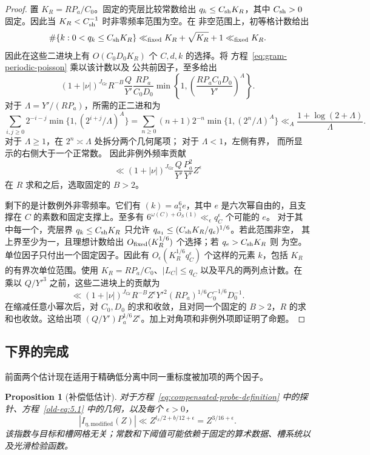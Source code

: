 \documentclass[11pt,a4paper]{article}
\numberwithin{equation}{section}
\numberwithin{figure}{section}
\newtheorem{proposition}[theorem]{Proposition}
\theoremstyle{definition}
\theoremstyle{remark}
\begin{document}
\begin{proof}
置 $K_R=RP_a/C_0$。固定的壳层比较常数给出
$q_k\le C_{\rm sh}K_R$，其中 $C_{\rm sh}>0$ 固定。因此当
$K_R<C_{\rm sh}^{-1}$ 时非零频率范围为空。在
非空范围上，初等格计数给出
\[
 \#\{k:0<q_k\le C_{\rm sh}K_R\}
       \ll_{\rm fixed}K_R+\sqrt{K_R}+1\ll_{\rm fixed}K_R.
\]
因此在这些二进块上有 $O(C_0D_0K_R)$ 个 $C,d,k$ 的选择。将
方程~\eqref{eq:gram-periodic-poisson} 乘以该计数以及
公共前因子，至多给出
\[
 (1+|\nu|)^{J_{\mathrm{Gr}}} R^{-B}\frac Q{Y'}\frac{RP_a}{C_0D_0}
       \min\left\{1,\left(\frac{RP_aC_0D_0}{Y'}\right)^A\right\}.
\]
对于 $\Lambda=Y'/(RP_a)$，所需的正二进和为
\[
 \sum_{i,j\ge0}2^{-i-j}\min\{1,(2^{i+j}/\Lambda)^A\}
 =\sum_{n\ge0}(n+1)2^{-n}\min\{1,(2^n/\Lambda)^A\}
 \ll_A\frac{1+\log(2+\Lambda)}{\Lambda}.
\]
对于 $\Lambda\ge1$，在 $2^n\asymp\Lambda$ 处拆分两个几何尾项；
对于 $\Lambda<1$，左侧有界，
而所显示的右侧大于一个正常数。
因此非例外频率贡献
\[
 \ll (1+|\nu|)^{J_{\mathrm{Gr}}}\frac Q{Y'}\frac{P_a^2}{Y'}Z^\epsilon
\]
在 $R$ 求和之后，选取固定的 $B>2$。

剩下的是计数例外非零频率。它们有
$(k)=a_1^6e$，其中 $e$ 是六次幂自由的，且支撑在
$C$ 的素数和固定支撑上。至多有
$6^{\omega(C)+O_S(1)}\ll_\epsilon q_C^\epsilon$ 个可能的 $e$。
对于其中每一个，壳层界 $q_k\le C_{\rm sh}K_R$ 只允许
$q_{a_1}\le(C_{\rm sh}K_R/q_e)^{1/6}$。若此范围非空，
其上界至少为一，且理想计数给出
$O_{\rm fixed}(K_R^{1/6})$ 个选择；若 $q_e>C_{\rm sh}K_R$ 则
为空。单位因子只付出一个固定因子。因此有
$O_\epsilon(K_R^{1/6}q_C^\epsilon)$ 个这样的元素 $k$，包括
$K_R$ 的有界次单位范围。使用 $K_R=RP_a/C_0$、$|L_C|\le q_C$ 以及平凡的两列点计数。在乘以 $Q/Y'^3$ 之前，这些二进块上的贡献为
\[
 \ll (1+|\nu|)^{J_{\mathrm{Gr}}} R^{-B}Z^\epsilon
       Y'^2(RP_a)^{1/6}C_0^{-1/6}D_0^{-1}.
\]
在缩减任意小幂次后，对 $C_0,D_0$ 的求和收敛，且对同一个固定的 $B>2$，$R$ 的求和也收敛。这给出项 $(Q/Y')P_a^{1/6}Z^\epsilon$。加上对角项和非例外项即证明了命题。
\end{proof}

\subsection{下界的完成}

前面两个估计现在适用于精确低分离中同一重标度被加项的两个因子。

\begin{proposition}[补偿低估计]\label{prop:probe-low}
对于方程~\eqref{eq:compensated-probe-definition} 中的探针、方程~\eqref{old-eq:5.1} 中的几何，以及每个 $\epsilon>0$，
\begin{equation}
 |I_{\eta,\mathrm{modified}}(Z)|
       \ll Z^{l_x/2+b/12+\epsilon}=Z^{3/16+\epsilon}.
 \label{old-eq:5.10}
\end{equation}
该指数与目标和槽网格无关；常数和下阈值可能依赖于固定的算术数据、槽系统以及光滑检验函数。
\end{proposition}
\end{document}
